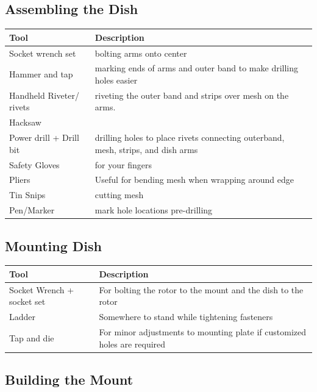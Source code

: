 \documentclass[11pt]{article} %
\begin{document}
\subsection{Assembling the Dish}

\begin{tabular}{| l | p{10cm} |}
\hline
\textbf{Tool} & \textbf{Description} \\ \hline \hline
Socket wrench set & bolting arms onto center\\ \hline
Hammer and tap & marking ends of arms and outer band to make drilling holes easier\\ \hline
Handheld Riveter/ rivets & riveting the outer band and strips over mesh on the arms.\\ \hline
Hacksaw & \\ \hline
Power drill + Drill bit & drilling holes to place rivets connecting outerband, mesh, strips, and dish arms\\ \hline
Safety Gloves & for your fingers\\ \hline
Pliers & Useful for bending mesh when wrapping around edge\\ \hline
Tin Snips & cutting mesh\\ \hline
Pen/Marker & mark hole locations pre-drilling\\ \hline
\end{tabular}


\subsection{Mounting Dish}

\begin{tabular}{| l | p{10cm} |}
\hline
\textbf{Tool} & \textbf{Description} \\ \hline \hline
Socket Wrench + socket set & For bolting the rotor to the mount and the dish to the rotor \\ \hline
Ladder & Somewhere to stand while tightening fasteners \\ \hline
Tap and die & For minor adjustments to mounting plate if customized holes are required \\ \hline
\end{tabular}


\subsection{Building the Mount}
\end{document}
